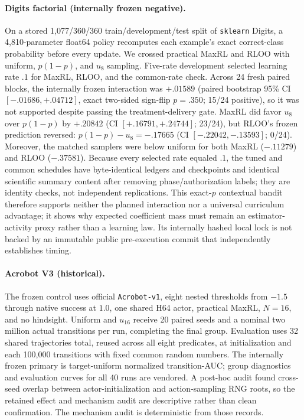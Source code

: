 \paragraph{Digits factorial (internally frozen negative).}
On a stored 1,077/360/360 train/development/test split of
\texttt{sklearn} Digits, a 4,810-parameter float64 policy recomputes each
example's exact correct-class probability before every update. We crossed
practical MaxRL and RLOO with uniform, $p(1-p)$, and $u_8$ sampling. Five-rate
development selected learning rate $.1$ for MaxRL, RLOO, and the common-rate
check. Across 24 fresh paired blocks, the internally frozen interaction
was $+.01589$ (paired bootstrap 95\% CI $[-.01686,+.04712]$, exact two-sided
sign-flip $p=.350$; 15/24 positive), so it was not supported despite passing
the treatment-delivery gate. MaxRL did favor $u_8$ over $p(1-p)$ by
$+.20842$ (CI $[+.16791,+.24744]$; 23/24), but RLOO's frozen prediction
reversed: $p(1-p)-u_8=-.17665$ (CI $[-.22042,-.13593]$; 0/24). Moreover,
the matched samplers were below uniform for both MaxRL ($-.11279$) and RLOO
($-.37581$). Because every selected rate equaled $.1$, the tuned and common
schedules have byte-identical ledgers and checkpoints and identical scientific
summary content after removing phase/authorization labels; they are identity
checks, not independent replications.
This exact-$p$ contextual bandit therefore supports neither the planned
interaction nor a universal curriculum advantage; it shows why expected
coefficient mass must remain an estimator-activity proxy rather than a
learning law. Its internally hashed local lock is not backed by an immutable
public pre-execution commit that independently establishes timing.

\paragraph{Acrobot V3 (historical).}
The frozen control uses official \texttt{Acrobot-v1}, eight nested thresholds
from $-1.5$ through native success at $1.0$, one shared H64 actor, practical MaxRL,
$N=16$, and no hindsight. Uniform and $u_{16}$ receive 20 paired seeds and a
nominal two million actual transitions per run, completing the final group.
Evaluation uses 32 shared trajectories total, reused across all eight
predicates, at initialization and each 100,000 transitions with fixed common
random numbers. The internally frozen primary is
target-uniform normalized transition-AUC; group diagnostics and evaluation
curves for all 40 runs are vendored. A post-hoc audit found cross-seed overlap
between actor-initialization and action-sampling RNG roots, so the retained
effect and mechanism audit are descriptive rather than clean confirmation.
The mechanism audit is deterministic from those records.

